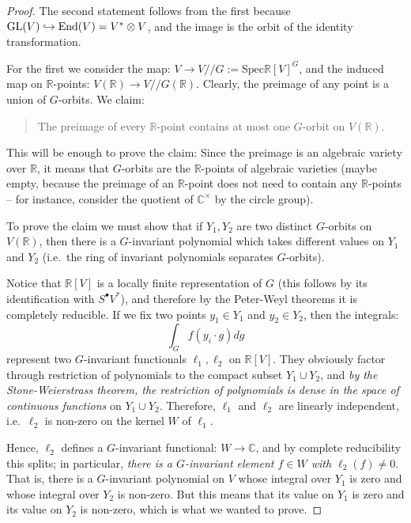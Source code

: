 \begin{proof}
 The second statement follows from the first because ${\rm GL}(V)\hookrightarrow \text{End}(V) = V^*\otimes V$, and the image is the orbit of the identity transformation.

 For the first we consider the map: $V\to V// G:=\text{Spec} \mathbb R[V]^G$, and the induced map on $\mathbb R$-points: $V(\mathbb R)\to V// G(\mathbb R)$. Clearly, the preimage of any point is a union of $G$-orbits. We claim:

\begin{quote}
 The preimage of every $\mathbb R$-point contains at most one $G$-orbit on $V(\mathbb R)$.
\end{quote}

This will be enough to prove the claim: Since the preimage is an algebraic variety over $\mathbb R$, it means that $G$-orbits are the $\mathbb R$-points of algebraic varieties (maybe empty, because the preimage of an $\mathbb R$-point does not need to contain any $\mathbb R$-points -- for instance, consider the quotient of $\mathbb C^\times$ by the circle group).

To prove the claim we must show that if $Y_1,Y_2$ are two distinct $G$-orbits on $V(\mathbb R)$, then there is a $G$-invariant polynomial which takes different values on $Y_1$ and $Y_2$ (i.e.\ the ring of invariant polynomials separates $G$-orbits). 

Notice that $\mathbb R[V]$ is a locally finite representation of $G$ (this follows by its identification with $S^\bullet V^*$), and therefore by the Peter-Weyl theorems it is completely reducible. If we fix two points $y_1\in Y_1$ and $y_2\in Y_2$, then the integrals:
$$\int_G f(y_i\cdot g) dg$$
represent two $G$-invariant functionals $\ell_1,\ell_2$ on $\mathbb R[V]$. They obviously factor through restriction of polynomials to the compact subset $Y_1\cup Y_2$, and \emph{by the Stone-Weierstrass theorem, the restriction of polynomials is dense in the space of continuous functions} on $Y_1\cup Y_2$. Therefore, $\ell_1$ and $\ell_2$ are linearly independent, i.e.\ $\ell_2$ is non-zero on the kernel $W$ of $\ell_1$. 

Hence, $\ell_2$ defines a $G$-invariant functional: $W\to \mathbb C$, and by complete reducibility this splits; in particular, \emph{there is a $G$-invariant element $f\in W$ with $\ell_2(f)\ne 0$}. That is, there is a $G$-invariant polynomial on $V$ whose integral over $Y_1$ is zero and whose integral over $Y_2$ is non-zero. But this means that its value on $Y_1$ is zero and its value on $Y_2$ is non-zero, which is what we wanted to prove.
\end{proof}


